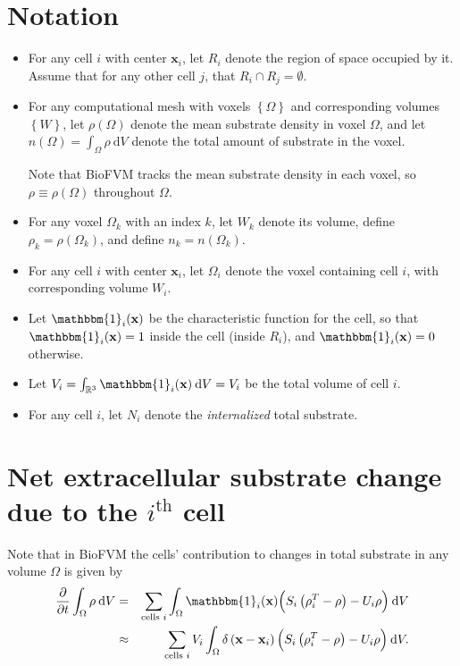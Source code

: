 \documentclass[11point]{article}
\newcommand{\beq}{\begin{eqnarray}}
\newcommand{\eeq}{\end{eqnarray}}
\renewcommand{\d}[1]{\:\mathrm{d}#1}
\renewcommand{\vec}[1]{\mathbf{#1}}
\newcommand{\one}{\mathbbm{1}}
\newcommand{\reals}{\mathbb{R}}
\newcommand{\df}[1]{\delta \left( #1 \right)}
\newcommand{\set}[1]{\left\{#1\right\}}
\begin{document}
\section{Notation}
\begin{itemize}
\item
For any cell $i$ with center $\vec{x}_i$, let $R_i$ denote the 
region of space occupied by it. Assume that for any other cell 
$j$, that $R_i \cap R_j = \emptyset$. 
\item 
For any  computational 
mesh with voxels $\set{ \Omega }$ and corresponding 
volumes $\set{W}$, let $\rho( \Omega) $ denote the mean 
substrate density in voxel $\Omega$, and let 
$n(\Omega) = \int_\Omega \rho \d{V}$ denote the total
 amount of substrate in the voxel. 

Note that BioFVM tracks the mean substrate density in each voxel, 
so $\rho \equiv \rho( \Omega )$ throughout $\Omega$. 
\item 
For any voxel $\Omega_k$ with an index $k$, let $W_k$ denote 
its volume, define $\rho_k = \rho( \Omega_k )$, and 
define $n_k = n( \Omega_k)$. 

\item 
For any cell $i$ with center $\vec{x}_i$, let $\Omega_i$ denote the 
voxel containing cell $i$, with corresponding volume $W_i$. 
\item
Let $\one_i(\vec{x})$ be the characteristic  function for the cell, so that 
$\one_i(\vec{x}) =1$ inside the cell (inside $R_i$), and 
$\one_i(\vec{x}) = 0$ otherwise. 
\item 
Let $V_i = \int_{\reals^3} \one_i(\vec{x}) \d{V} = V_i$ be the total volume of cell $i$. 
\item 
For any cell $i$, let $N_i$ denote the \emph{internalized} total substrate. 

\end{itemize}

\section{Net extracellular substrate change 
due to the $i^\textrm{th}$ cell}
Note that in BioFVM the cells' contribution 
to changes in total substrate in any volume $\Omega$ is given by 
\beq
\frac{ \partial }{ \partial t} 
\int_\Omega \rho \d{V} & = &  
\sum_{\textrm{cells } i} 
\int_\Omega  \one_i(\vec{x})
\Bigl(  S_i \left( \rho^T_i - \rho \right)  - U_i \rho   \Bigr) \d{V}\\
& \approx & 
\sum_{\textrm{cells } i}
V_i \int_\Omega \df{ \vec{x} - \vec{x}_i }
\Bigl(  S_i \left( \rho^T_i - \rho \right)  - U_i \rho   \Bigr) \d{V}.
\eeq 
\end{document}
